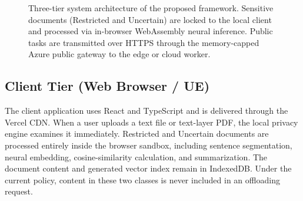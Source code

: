 \documentclass[conference]{IEEEtran}
\begin{document}
\begin{figure}[t]
{%
}
\caption{Three-tier system architecture of the proposed framework. Sensitive documents (Restricted and Uncertain) are locked to the local client and processed via in-browser WebAssembly neural inference. Public tasks are transmitted over HTTPS through the memory-capped Azure public gateway to the edge or cloud worker.}
\label{fig:arch}
\end{figure}

\subsection{Client Tier (Web Browser / UE)}
The client application uses React and TypeScript and is delivered through the Vercel CDN.
When a user uploads a text file or text-layer PDF, the local privacy engine examines it immediately.
Restricted and Uncertain documents are processed entirely inside the browser sandbox, including sentence segmentation, neural embedding, cosine-similarity calculation, and summarization.
The document content and generated vector index remain in IndexedDB.
Under the current policy, content in these two classes is never included in an offloading request.
\end{document}
